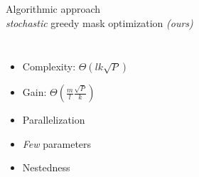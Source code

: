 \begin{frame}{Algorithmic approach\\[-3mm] {\normalsize \textit{stochastic} greedy mask optimization \textit{(ours)}}}
\begin{columns}[T]
\begin{itemize}
\item Complexity: $\Theta(l k \sqrt{P})$
\item Gain: $\Theta\left(\frac{m}{l}\frac{\sqrt{P}}{k}\right)$
\item Parallelization
\item \textit{Few} parameters
\item  Nestedness
\end{itemize}
\end{columns}	
\end{frame}




  
	
